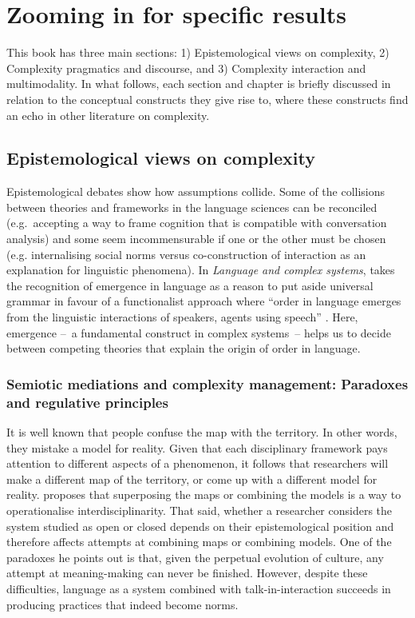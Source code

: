 \documentclass[output=paper]{langscibook}
\begin{document}
\section{Zooming in for specific results}\largerpage

This book has three main sections:
1) Epistemological views on complexity,
2) Complexity pragmatics and discourse, and
3) Complexity interaction and multimodality.
In what follows, each section and chapter is briefly discussed in relation to the conceptual constructs they give rise to, where these constructs find an echo in other literature on complexity.

\subsection{Epistemological views on complexity}

Epistemological debates show how assumptions collide. Some of the collisions between theories and frameworks in the language sciences can be reconciled (e.g.~accepting a way to frame cognition that is compatible with conversation analysis) and some seem incommensurable if one or the other must be chosen (e.g. internalising social norms versus co-construction of interaction as an explanation for linguistic phenomena). In \textit{Language and complex systems}, \citet{Kretzschmar2015} takes the recognition of emergence in language as a reason to put aside universal grammar in favour of a functionalist approach where “order in language emerges from the linguistic interactions of speakers, agents using speech” \citep[2]{Kretzschmar2015}. Here, emergence –~a fundamental construct in complex systems~– helps us to decide between competing theories that explain the origin of order in language.

\subsubsection{Semiotic mediations and complexity management: Paradoxes and regulative principles}

It is well known that people confuse the map with the territory. In other words, they mistake a model for reality. Given that each disciplinary framework pays attention to different aspects of a phenomenon, it follows that researchers will make a different map of the territory, or come up with a different model for reality.  proposes that superposing the maps or combining the models is a way to operationalise interdisciplinarity. That said, whether a researcher considers the system studied as open or closed depends on their epistemological position and therefore affects attempts at combining maps or combining models. One of the paradoxes he points out is that, given the perpetual evolution of culture, any attempt at meaning-making can never be finished. However, despite these difficulties, language as a system combined with talk-in-interaction succeeds in producing practices that indeed become norms.
\end{document}
